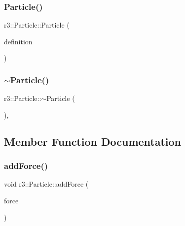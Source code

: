 \mbox{\label{classr3_1_1_particle_a28a47b80f79433db842a47aca835003a}} 
\subsubsection{\texorpdfstring{Particle()}{Particle()}\hspace{0.1cm}{\footnotesize\ttfamily [2/2]}}
{\footnotesize\ttfamily r3\+::\+Particle\+::\+Particle (\begin{DoxyParamCaption}\item[{const \mbox{\hyperlink{structr3_1_1_particle_def}{Particle\+Def}} \&}]{definition }\end{DoxyParamCaption})\hspace{0.3cm}{\ttfamily [explicit]}}

\mbox{\label{classr3_1_1_particle_a235fd8a567a6ec911f26ca49a8045460}} 
\subsubsection{\texorpdfstring{$\sim$\+Particle()}{~Particle()}}
{\footnotesize\ttfamily r3\+::\+Particle\+::$\sim$\+Particle (\begin{DoxyParamCaption}{ }\end{DoxyParamCaption})\hspace{0.3cm}{\ttfamily [virtual]}, {\ttfamily [default]}}



\subsection{Member Function Documentation}
\mbox{\label{classr3_1_1_particle_a18bc9d9ded382879086eb2820ce787c9}} 
\subsubsection{\texorpdfstring{add\+Force()}{addForce()}}
{\footnotesize\ttfamily void r3\+::\+Particle\+::add\+Force (\begin{DoxyParamCaption}\item[{const glm\+::vec3 \&}]{force }\end{DoxyParamCaption})}

